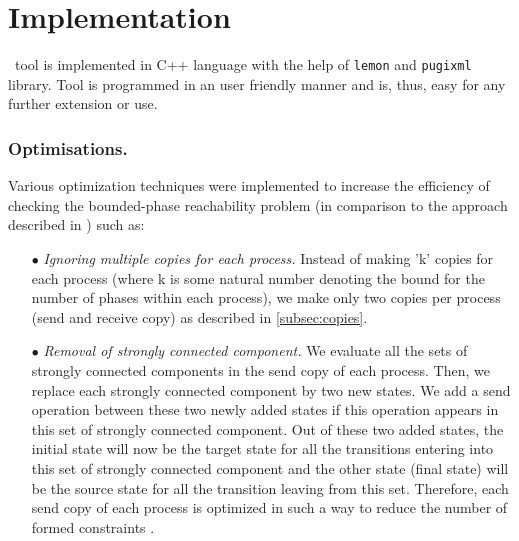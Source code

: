 \section{Implementation}

\MPass\ tool is implemented in C++ language with the help of {\tt lemon} and {\tt pugixml} library.
Tool is programmed in an user friendly manner and is, thus, easy for any further extension or use.

\subsubsection{Optimisations.}

Various optimization techniques were implemented to increase the efficiency of checking the bounded-phase reachability problem (in comparison  to the approach described in  \cite{AAC13}) such as:

\begin{itemize}
\item[$\bullet$] \emph{Ignoring multiple copies for each process.}
Instead of making 'k' copies for each process (where k is some natural 
number denoting the bound for the number of phases within each process), 
we make only two copies per process (send and receive copy) as described in \cref{subsec:copies}.
\item[$\bullet$] \emph{Removal of strongly connected component.}
We evaluate all the sets of strongly connected components in the send copy of each process. 
Then, we replace  each strongly connected component  by   two new states. We add a send operation between these two newly added states if this operation appears in this set of strongly connected component.  Out of these two added states, the initial state will now be the target state for  all the transitions entering into this set of strongly connected component  and the other state (final state) will be 
the source state for all the transition leaving from this set. Therefore, each send copy of each 
process is optimized in such a way to reduce the number of formed constraints .
\end{itemize}
